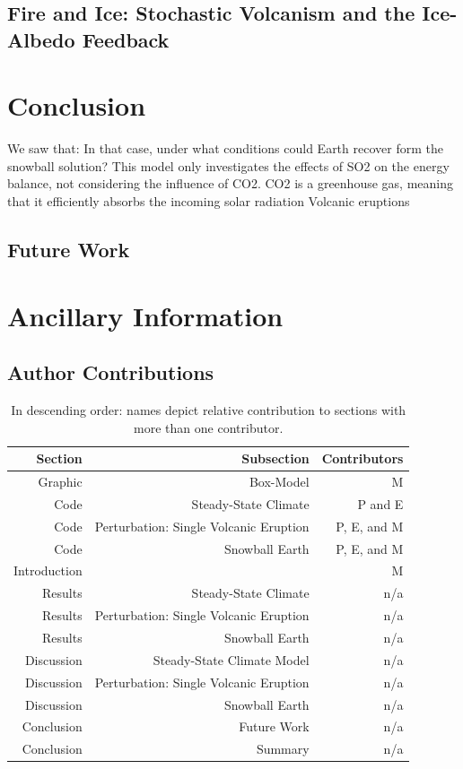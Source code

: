 \documentclass[12pt]{article}
\begin{document}
\subsection{Fire and Ice: Stochastic Volcanism and the Ice-Albedo Feedback}
\label{sec:snowballearth}

\section{Conclusion}
We saw that:
In that case, under what conditions could Earth recover form the snowball solution?
This model only investigates the effects of SO2 on the energy balance, not considering
the influence of CO2. CO2 is a greenhouse gas, meaning that it efficiently absorbs the
incoming solar radiation Volcanic eruptions 
\subsection{Future Work}

\section{Ancillary Information}
\subsection{Author Contributions}

\begin{table}[H]
    \centering
    \begin{tabular}{rrr}
    Section & Subsection & Contributors \\
    \hline
    Graphic & Box-Model & M  \\
    Code & Steady-State Climate & P and E \\
    Code & Perturbation: Single Volcanic Eruption & P, E, and M \\
    Code & Snowball Earth & P, E, and M \\
    Introduction &  & M \\
    Results & Steady-State Climate & n/a \\
    Results & Perturbation: Single Volcanic Eruption & n/a \\
    Results & Snowball Earth & n/a\\
    Discussion & Steady-State Climate Model & n/a \\
    Discussion & Perturbation: Single Volcanic Eruption & n/a \\
    Discussion & Snowball Earth & n/a\\
    Conclusion & Future Work & n/a \\
    Conclusion & Summary & n/a \\
    \end{tabular}
    \caption{
        In descending order: names depict relative contribution to
        sections with more than one contributor.
    }
    \label{tab:contributions}
\end{table}
\end{document}
